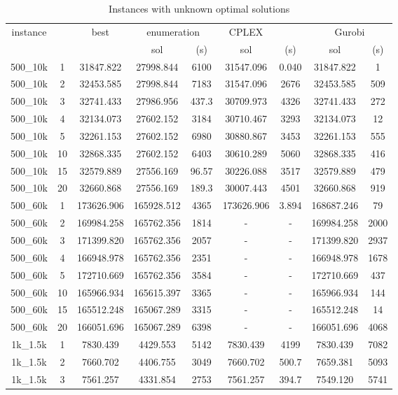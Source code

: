 \documentclass[10pt]{article}
\begin{document}
\begin{table}[h]\footnotesize
\caption{Instances with unknown optimal solutions}
	\centering
\begin{tabular}{ccc|cc|cc|cc}
\hline 
\multirow{2}{*}{{instance}} & \multirow{2}{*}{{}} & \multirow{2}{*}{{best}} & \multicolumn{2}{c|}{{enumeration}} & {CPLEX} &  & \multicolumn{2}{c}{{Gurobi}}\tabularnewline
\cline{4-9} 
 &  &  & {sol} & { (s)} & {sol} & { (s)} & {sol} & { (s)}\tabularnewline
\hline 
{500\_10k} & {1} & {31847.822} & {27998.844} & {6100} & {31547.096} & {0.040} & {31847.822} & {1}\tabularnewline
{500\_10k} & {2} & {32453.585} & {27998.844} & {7183} & {31547.096} & {2676} & {32453.585} & {509}\tabularnewline
{500\_10k} & {3} & {32741.433} & {27986.956} & {437.3} & {30709.973} & {4326} & {32741.433} & {272}\tabularnewline
{500\_10k} & {4} & {32134.073} & {27602.152} & {3184} & {30710.467} & {3293} & {32134.073} & {12}\tabularnewline
{500\_10k} & {5} & {32261.153} & {27602.152} & {6980} & {30880.867} & {3453} & {32261.153} & {555}\tabularnewline
{500\_10k} & {10} & {32868.335} & {27602.152} & {6403} & {30610.289} & {5060} & {32868.335} & {416}\tabularnewline
{500\_10k} & {15} & {32579.889} & {27556.169} & {96.57} & {30226.088} & {3517} & {32579.889} & {479}\tabularnewline
{500\_10k} & {20} & {32660.868} & {27556.169} & {189.3} & {30007.443} & {4501} & {32660.868} & {919}\tabularnewline
\hline 
{500\_60k} & {1} & {173626.906} & {165928.512} & {4365} & {173626.906} & {3.894} & {168687.246} & {79}\tabularnewline
{500\_60k} & {2} & {169984.258} & {165762.356} & {1814} & {-} & - & {169984.258} & {2000}\tabularnewline
{500\_60k} & {3} & {171399.820} & {165762.356} & {2057} & {-} & - & {171399.820} & {2937}\tabularnewline
{500\_60k} & {4} & {166948.978} & {165762.356} & {2351} & {-} & - & {166948.978} & {1678}\tabularnewline
{500\_60k} & {5} & {172710.669} & {165762.356} & {3584} & {-} & {-} & {172710.669} & {437}\tabularnewline
{500\_60k} & {10} & {165966.934} & {165615.397} & {3365} & {-} & {-} & {165966.934} & {144}\tabularnewline
{500\_60k} & {15} & {165512.248} & {165067.289} & {3315} & {-} & - & {165512.248} & {14}\tabularnewline
{500\_60k} & {20} & {166051.696} & {165067.289} & {6398} & {-} & {-} & {166051.696} & {4068}\tabularnewline
\hline 
{1k\_1.5k} & {1} & {7830.439} & {4429.553} & {5142} & {7830.439} & {4199} & {7830.439} & {7082}\tabularnewline
{1k\_1.5k} & {2} & {7660.702} & {4406.755} & {3049} & {7660.702} & {500.7} & {7659.381} & {5093}\tabularnewline
{1k\_1.5k} & {3} & {7561.257} & {4331.854} & {2753} & {7561.257} & {394.7} & {7549.120} & {5741}\tabularnewline

\end{tabular}
\end{table}
\end{document}
